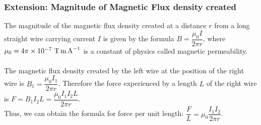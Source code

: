 \subsubsection*{Extension: Magnitude of Magnetic Flux density created}
 The magnitude of the magnetic flux density created at a distance $r$ from a long straight
wire carrying current $I$ is given by the formula $B=\dfrac{\mu_0I}{2\pi r}$, where $\mu_0=4\pi\times 10^{-7}\ \text{T\,m\,A}^{-1}$ is a constant of
physics called magnetic permeability. \\\\
The magnetic flux density
created by the left wire at the position of the right wire is $B_1=\dfrac{\mu_0I_1}{2\pi r}$. 
Therefore the force experienced by a length $L$ of the right wire is $F=B_1I_2L=\dfrac{\mu_0I_1I_2L}{2\pi r}$.\\
Thus, we can obtain the formula for force per unit length: $\dfrac{F}{L}=\mu_0\dfrac{I_1I_2}{2\pi r}$.

